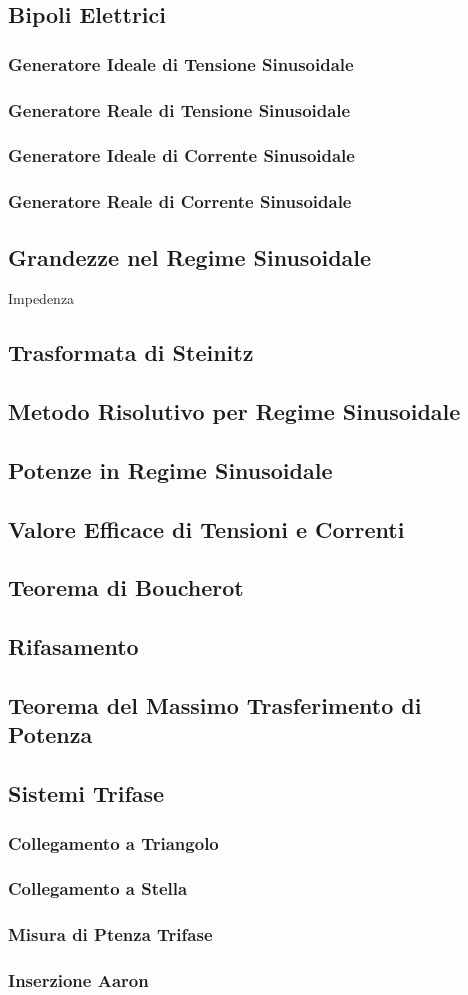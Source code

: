 \documentclass[../main.tex]{subfiles}
\begin{document}
	\subsection{Bipoli Elettrici}
	\subsubsection{Generatore Ideale di Tensione Sinusoidale}
	\subsubsection{Generatore Reale di Tensione Sinusoidale}
	\subsubsection{Generatore Ideale di Corrente Sinusoidale}
	\subsubsection{Generatore Reale di Corrente Sinusoidale}
	\subsection{Grandezze nel Regime Sinusoidale}
	Impedenza
	\subsection{Trasformata di Steinitz}
	\subsection{Metodo Risolutivo per Regime Sinusoidale}
	\subsection{Potenze in Regime Sinusoidale}
	\subsection{Valore Efficace di Tensioni e Correnti}
	\subsection{Teorema di Boucherot}
	\subsection{Rifasamento}
	\subsection{Teorema del Massimo Trasferimento di Potenza}
	\subsection{Sistemi Trifase}
	\subsubsection{Collegamento a Triangolo}
	\subsubsection{Collegamento a Stella}
	\subsubsection{Misura di Ptenza Trifase}
	\subsubsection{Inserzione Aaron}
\end{document}

